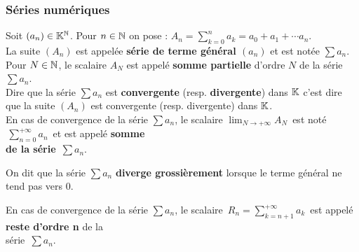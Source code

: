 \vspace*{1cm}

\subsubsection{Séries numériques}

\vspace{0.5cm}

Soit \((a_n)\in \mathbb{K}^{\mathbb{N}}\). Pour \(n\in \mathbb{N}\) on pose : \(\displaystyle A_n=\sum_{k=0}^{n} a_k = a_0+a_1+\cdots a_n.  \)\\
La suite \((A_n)\) est appelée \textbf{série de terme général $(a_n)$} et est notée \(\sum a_n\).\vspace{0.2cm}\\
Pour $N\in\mathbb{N}$, le scalaire \(A_N\) est appelé \textbf{somme partielle} d'ordre $N$ de la série \(\sum a_n\).\vspace{0.5cm}\\
Dire que la série \(\sum a_n\) est \textbf{convergente} (resp. \textbf{divergente}) dans \(\mathbb{K}\) c'est dire que la suite \((A_n)\) est convergente (resp. divergente) dans \(\mathbb{K}\).\vspace{-0.3cm}\\
En cas de convergence de la série \(\sum a_n\), le scalaire \(\displaystyle \lim_{N \to +\infty} A_N\,  \) est noté \(\,\displaystyle \sum_{n = 0}^{+\infty}a_n  \,\) et est appelé \textbf{somme}\vspace{-0.3cm} \\
\textbf{de la série} \(\,\sum a_n\).

\vspace{0.3cm}

On dit que la série \(\sum a_n\) \textbf{diverge grossièrement} lorsque le terme général ne tend pas vers $0$.

\vspace{0.3cm}

\noindent En cas de convergence de la série \(\sum a_n\), le scalaire \(\,\displaystyle R_n=\!\!\sum_{k=n+1}^{+\infty} a_k \, \) est appelé \textbf{reste d'ordre n} de la \vspace{-0.3cm} \\
série \(\,\sum a_n\).

\vspace{1.2cm}

